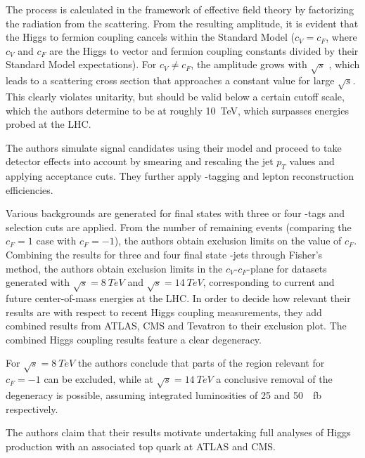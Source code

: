 The process \HepProcess{\PW\Pqb\to\Pqt\Ph} is calculated in the framework of effective field theory by factorizing the \PW radiation from the \Pqb scattering.
From the resulting amplitude, it is evident that the Higgs to fermion coupling cancels within the Standard Model ($c_V = c_F$, where $c_V$ and $c_F$ are the Higgs to vector and fermion coupling constants divided by their Standard Model expectations).
For $c_V \neq c_F$, the amplitude grows with $\sqrt{s}$ , which leads to a scattering cross section that approaches a constant value for large $\sqrt{s}$.
This clearly violates unitarity, but should be valid below a certain cutoff scale, which the authors determine to be at roughly \SI{10}{TeV}, which surpasses energies probed at the LHC.

The authors simulate signal candidates using their model and proceed to take detector effects into account by smearing and rescaling the jet $p_T$ values and applying acceptance cuts.
They further apply \Pqb-tagging and lepton reconstruction efficiencies.

Various backgrounds are generated for final states with three or four \Pqb-tags and selection cuts are applied.
From the number of remaining events (comparing the $c_F=1$ case with $c_F=-1$), the authors obtain exclusion limits on the value of $c_F$.
Combining the results for three and four final state \Pqb-jets through Fisher's method, the authors obtain exclusion limits in the $c_V$-$c_F$-plane for datasets generated with $\sqrt{s}=\SI{8}{TeV}$ and $\sqrt{s}=\SI{14}{TeV}$, corresponding to current and future center-of-mass energies at the LHC.
In order to decide how relevant their results are with respect to recent Higgs coupling measurements, they add combined results from ATLAS, CMS and Tevatron \cite{espinosa} to their exclusion plot.
The combined Higgs coupling results feature a clear degeneracy.

For $\sqrt{s}=\SI{8}{TeV}$ the authors conclude that parts of the region relevant for $c_F=-1$ can be excluded, while at $\sqrt{s}=\SI{14}{TeV}$ a conclusive removal of the degeneracy is possible, assuming integrated luminosities of \num{25} and \SI{50}{\per\femto\barn} respectively.

The authors claim that their results motivate undertaking full analyses of Higgs production with an associated top quark at ATLAS and CMS.

\vspace{1em}

\nocite{*}
\printbibliography


